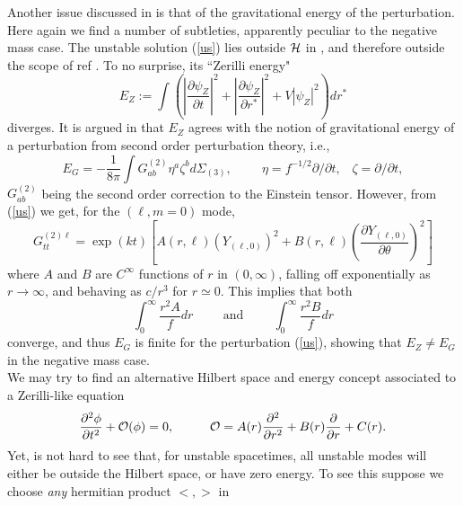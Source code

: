\documentclass[12pt,aps,floats,showpacs,amssymb,tightenlines]{revtex4}
\newcommand{\p}{\partial}
\renewcommand{\o}{{\cal{O}}}
\begin{document}
Another issue discussed in \cite{ghi} is that of the gravitational
energy of the perturbation. Here again we find a number of
subtleties, apparently peculiar to the negative mass case. The
unstable solution (\ref{us}) lies outside ${\cal H}$ in \cite{ghi},
and therefore outside the scope of ref \cite{ghi}. To no surprise,
its ``Zerilli energy"
\begin{equation} \label{ez}
E_Z := \int \left( \left| \frac{\p \psi_Z}{\p t} \right| ^2 + \left|
\frac{\p \psi_Z}{\p r^*} \right| ^2 + V | \psi_Z |^2 \right) dr^*
\end{equation}
diverges. It is argued in \cite{ghi} that $E_Z$ agrees with the
notion of gravitational energy of a perturbation from second order
perturbation theory, i.e.,
\begin{equation} \label{sean1}
E_G = - \frac{1}{8 \pi} \int G^{(2)}_{ab} \eta^a \zeta^b d
\Sigma_{(3)},\hspace{1cm}\eta = f^{-1/2} \partial / \partial t,
\;\;\; \zeta = \partial / \partial t,
\end{equation}
$G^{(2)}_{ab} $ being the second order correction to the Einstein
tensor. However, from (\ref{us}) we get, for the $(\ell,m=0)$ mode,
\begin{equation} \label{sean2}
 G^{(2) \ell}_{tt} = \exp(kt) \left[ A(r,\ell) \left( Y_{(\ell,0)} \right)^2 +
 B(r,\ell) \left( \frac{\partial Y_{(\ell,0)}}{ \partial \theta}
 \right)^2 \right]
 \end{equation}
where  $A$ and $B$ are  $C^{\infty}$ functions of $r$ in $(0,
\infty)$, falling off exponentially as $r \to \infty$, and behaving
as $c/r^3$ for $r \simeq 0$. This implies that both
$$\int_0^{\infty} \frac{r^2 A}{f} dr \hspace{1cm}\text{and} \hspace{1cm}
\int_0^{\infty} \frac{r^2 B}{f} dr$$ converge,
 and thus $E_G$ is finite for the  perturbation (\ref{us}),  showing that $E_Z \neq E_G$
 in the negative mass case. \\
 We may try to find an alternative Hilbert space and energy concept
 associated to a
Zerilli-like equation
\begin{equation}
\frac{\p^2 \phi}{\p t^2} + \o (\phi)= 0, \hspace{1cm} \o = A(r)
\frac{\p^2}{\p r^2} + B(r) \frac{\p}{\p r} + C(r).
\end{equation}
Yet, is not hard to see that, for unstable spacetimes, all unstable
modes will either be outside the Hilbert space, or have zero energy.
To see this suppose we choose {\em any} hermitian product $<,>$ in
\end{document}
